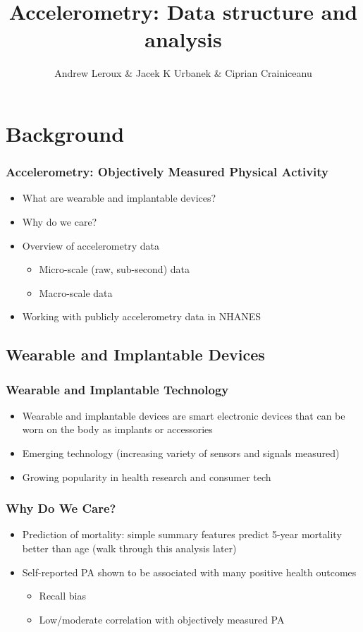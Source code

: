 \documentclass[10pt]{beamer}\usepackage[]{graphicx}\usepackage[]{color}
\newcommand\makebeamertitle{\frame{\maketitle}}%
\begin{document}
\title[]{Accelerometry: Data structure and analysis}
\author[]{Andrew Leroux \& Jacek K Urbanek \& Ciprian Crainiceanu}
\makebeamertitle




\section{Background}

\begin{frame}
\frametitle{Accelerometry: Objectively Measured Physical Activity}
\begin{itemize}
\item What are wearable and implantable devices?
\item Why do we care?
\item Overview of accelerometry data 
    \begin{itemize}
    \item Micro-scale (raw, sub-second) data
    \item Macro-scale data
    \end{itemize}
\item Working with publicly accelerometry data in NHANES
\end{itemize}
\end{frame}


\subsection{Wearable and Implantable Devices}


\begin{frame}
\frametitle{Wearable and Implantable Technology}
\begin{itemize}
\item Wearable and implantable devices are smart electronic devices that can be worn on the body as implants or accessories
\item Emerging technology (increasing variety of sensors and signals measured)
\item Growing popularity in health research and consumer tech
\end{itemize}
\end{frame}


\begin{frame}
\frametitle{Why Do We Care?}
\begin{itemize}
\item Prediction of mortality: simple summary features predict 5-year mortality better than age (walk through this analysis later)
\item Self-reported PA shown to be associated with many positive health outcomes
    \begin{itemize}
    \item Recall bias
    \item Low/moderate correlation with objectively measured PA
    \end{itemize}
\end{itemize}
\end{frame}
\end{document}
